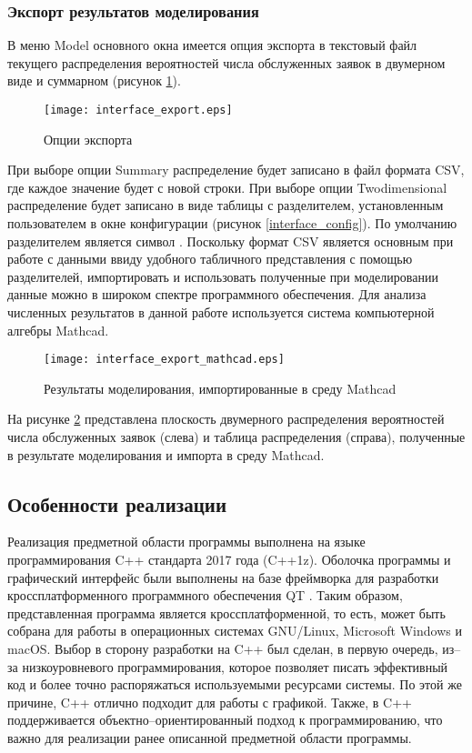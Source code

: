 \subsubsection{Экспорт результатов моделирования}
В меню Model основного окна имеется опция экспорта в текстовый файл текущего распределения вероятностей числа обслуженных заявок в двумерном виде и суммарном (рисунок \ref{interface_export}).
\begin{figure}[H]
	\centering
	\texttt{[image: interface\_export.eps]}
	\caption{Опции экспорта}
	\label{interface_export}
\end{figure}
При выборе опции Summary распределение будет записано в файл формата CSV, где каждое значение будет с новой строки. При выборе опции Twodimensional распределение будет записано в виде таблицы с разделителем, установленным пользователем в окне конфигурации (рисунок \ref{interface_config}). По умолчанию разделителем является символ \textquote{;}. Поскольку формат CSV является основным при работе с данными ввиду удобного табличного представления с помощью разделителей, импортировать и использовать полученные при моделировании данные можно в широком спектре программного обеспечения. Для анализа численных результатов в данной работе используется система компьютерной алгебры Mathcad.
\begin{figure}[H]
	\centering
	\texttt{[image: interface\_export\_mathcad.eps]}
	\caption{Результаты моделирования, импортированные в среду Mathcad}
	\label{interface_export_mathcad}
\end{figure}
На рисунке \ref{interface_export_mathcad} представлена плоскость двумерного распределения вероятностей числа обслуженных заявок (слева) и таблица распределения (справа), полученные в результате моделирования и импорта в среду Mathcad.

\subsection{Особенности реализации}
Реализация предметной области программы выполнена на языке программирования C++ стандарта 2017 года (C++1z). Оболочка программы и графический интерфейс были выполнены на базе фреймворка для разработки кроссплатформенного программного обеспечения QT \cite{QtDoc}. Таким образом, представленная программа является кроссплатформенной, то есть, может быть собрана для работы в операционных системах GNU/Linux, Microsoft Windows и macOS. Выбор в сторону разработки на C++ был сделан, в первую очередь, из--за низкоуровневого программирования, которое позволяет писать эффективный код и более точно распоряжаться используемыми ресурсами системы. По этой же причине, C++ отлично подходит для работы с графикой. Также, в C++ поддерживается объектно--ориентированный подход к программированию, что важно для реализации ранее описанной предметной области программы.

